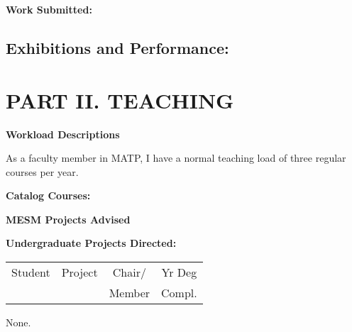 \documentclass[10pt]{article}
\begin{document}
{\setlength{\extrarowheight}{3.5pt}

}

 

\vspace{0.2cm}

{\bf Work Submitted:}


 {\setlength{\extrarowheight}{3.5pt}

}

\vspace{0.2cm}
\subsection{{\bf Exhibitions and Performance:}}

 {\setlength{\extrarowheight}{3.5pt}

}


\vspace{1cm}
\section*{\textbf{PART II.  TEACHING}}

\vspace{0.5cm}

\textbf{Workload Descriptions}

\begin{enumerate}
{\footnotesize
As a faculty member in MATP, I have a normal teaching load of three regular courses per year.


}
\end{enumerate}


\vspace{0.5cm}
{\bf Catalog Courses:}


\vspace{0.5cm}
{\bf MESM Projects Advised}


\vspace{1cm}
{\bf Undergraduate Projects Directed:}
{\setlength{\extrarowheight}{3.5pt}
\tablehead{}
\begin{supertabular}{lp{11cm}cc} 
Student & Project & Chair/ & Yr Deg \\
 & & Member & Compl. \\
 \hline
\end{supertabular}
}
None.
\end{document}
